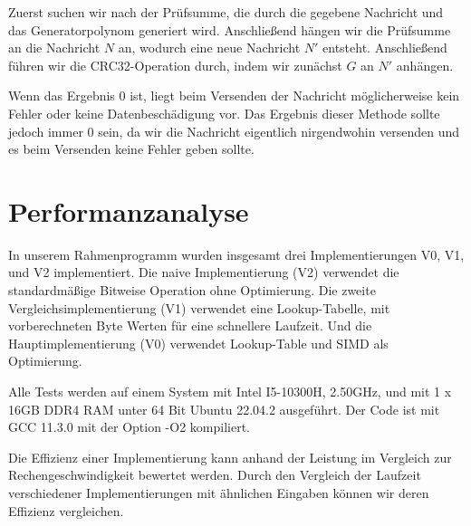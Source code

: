 \documentclass[course=erap]{aspdoc}
\begin{document}
    Zuerst suchen wir nach der Prüfsumme, die durch die gegebene Nachricht und das Generatorpolynom generiert wird. Anschließend hängen wir die Prüfsumme an die Nachricht $N$ an, wodurch eine neue Nachricht $N'$ entsteht. Anschließend führen wir die CRC32-Operation durch, indem wir zunächst $G$ an $N'$ anhängen. 
    
    Wenn das Ergebnis 0 ist, liegt beim Versenden der Nachricht möglicherweise kein Fehler oder keine Datenbeschädigung vor. Das Ergebnis dieser Methode sollte jedoch immer 0 sein, da wir die Nachricht eigentlich nirgendwohin versenden und es beim Versenden keine Fehler geben sollte.

\section{Performanzanalyse}
In unserem Rahmenprogramm wurden insgesamt drei Implementierungen V0, V1, und V2 implementiert. Die naive Implementierung (V2) verwendet die standardmäßige Bitweise Operation ohne Optimierung. Die zweite Vergleichsimplementierung (V1) verwendet eine Lookup-Tabelle,  mit vorberechneten Byte Werten für eine schnellere Laufzeit. Und die Hauptimplementierung (V0) verwendet Lookup-Table und SIMD als Optimierung. 

    Alle Tests werden auf einem System mit Intel I5-10300H, 2.50GHz, und mit 1 x 16GB DDR4 RAM unter 64 Bit Ubuntu 22.04.2 ausgeführt. Der Code ist mit GCC 11.3.0 mit der Option -O2 kompiliert.

    Die Effizienz einer Implementierung kann anhand der Leistung im Vergleich zur Rechengeschwindigkeit bewertet werden. Durch den Vergleich der Laufzeit verschiedener Implementierungen mit ähnlichen Eingaben können wir deren Effizienz vergleichen.
\end{document}
